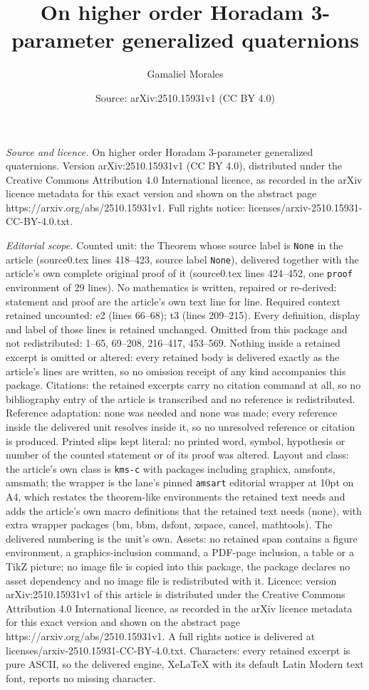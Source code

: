 \documentclass[10pt,a4paper]{amsart}
\title[On higher order Horadam 3-parameter generalized quaternions]{On higher order Horadam 3-parameter generalized quaternions}
\author{Gamaliel Morales}
\date{Source: arXiv:2510.15931v1 (CC BY 4.0)}
\begin{document}
\maketitle

\noindent\emph{Source and licence.} On higher order Horadam 3-parameter generalized quaternions. Version arXiv:2510.15931v1 (CC BY 4.0), distributed under the Creative Commons Attribution 4.0 International licence, as recorded in the arXiv licence metadata for this exact version and shown on the abstract page https://arxiv.org/abs/2510.15931v1. Full rights notice: licenses/arxiv-2510.15931-CC-BY-4.0.txt.\par\smallskip

\noindent\textit{Editorial scope.} Counted unit: the Theorem whose source label is \texttt{None} in the article (source0.tex lines 418--423, source label \texttt{None}), delivered together with the article's own complete original proof of it (source0.tex lines 424--452, one \texttt{proof} environment of 29 lines). No mathematics is written, repaired or re-derived: statement and proof are the article's own text line for line. Required context retained uncounted: e2 (lines 66--68); t3 (lines 209--215). Every definition, display and label of those lines is retained unchanged. Omitted from this package and not redistributed: 1--65, 69--208, 216--417, 453--569. Nothing inside a retained excerpt is omitted or altered: every retained body is delivered exactly as the article's lines are written, so no omission receipt of any kind accompanies this package. Citations: the retained excerpts carry no citation command at all, so no bibliography entry of the article is transcribed and no reference is redistributed. Reference adaptation: none was needed and none was made; every reference inside the delivered unit resolves inside it, so no unresolved reference or citation is produced. Printed slips kept literal: no printed word, symbol, hypothesis or number of the counted statement or of its proof was altered. Layout and class: the article's own class is \texttt{kms-c} with packages including graphicx, amsfonts, amsmath; the wrapper is the lane's pinned \texttt{amsart} editorial wrapper at 10pt on A4, which restates the theorem-like environments the retained text needs and adds the article's own macro definitions that the retained text needs (none), with extra wrapper packages (bm, bbm, dsfont, xspace, cancel, mathtools). The delivered numbering is the unit's own. Assets: no retained span contains a figure environment, a graphics-inclusion command, a PDF-page inclusion, a table or a TikZ picture; no image file is copied into this package, the package declares no asset dependency and no image file is redistributed with it. Licence: version arXiv:2510.15931v1 of this article is distributed under the Creative Commons Attribution 4.0 International licence, as recorded in the arXiv licence metadata for this exact version and shown on the abstract page https://arxiv.org/abs/2510.15931v1. A full rights notice is delivered at licenses/arxiv-2510.15931-CC-BY-4.0.txt. Characters: every retained excerpt is pure ASCII, so the delivered engine, XeLaTeX with its default Latin Modern text font, reports no missing character.
\end{document}
